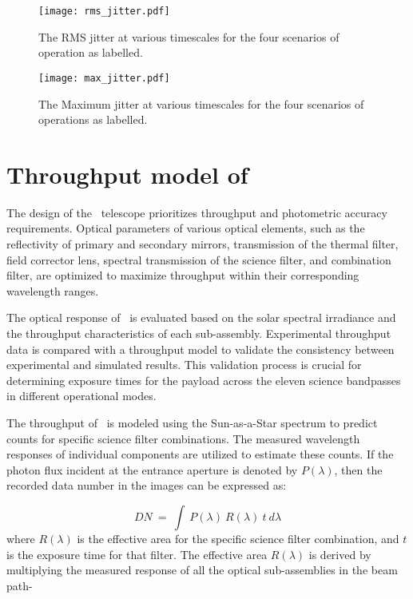 \begin{figure}[ht!]
    \centering
    \texttt{[image: rms\_jitter.pdf]}
    \caption{The RMS jitter at various timescales for the four scenarios of operation as labelled.}
    \label{fig:rms_jitter}
\end{figure}

\begin{figure}[ht!]
    \centering
    \texttt{[image: max\_jitter.pdf]}
    \caption{The Maximum jitter at various timescales for the four scenarios of operations as labelled.}
    \label{fig:max_jitter}
\end{figure}

\section{Throughput model of {\suit}}\label{sec:suit_throughput}

The design of the \suit~telescope prioritizes throughput and photometric accuracy requirements. Optical parameters of various optical elements, such as the reflectivity of primary and secondary mirrors, transmission of the thermal filter, field corrector lens, spectral transmission of the science filter, and combination filter, are optimized to maximize throughput within their corresponding wavelength ranges.

The optical response of \suit~is evaluated based on the solar spectral irradiance and the throughput characteristics of each sub-assembly. Experimental throughput data is compared with a throughput model to validate the consistency between experimental and simulated results. This validation process is crucial for determining exposure times for the payload across the eleven science bandpasses in different operational modes.

The throughput of \suit~is modeled using the Sun-as-a-Star spectrum to predict counts for specific science filter combinations. The measured wavelength responses of individual components are utilized to estimate these counts. If the photon flux incident at the entrance aperture is denoted by $P(\lambda)$, then the recorded data number in the images can be expressed as:

 \begin{equation}\label{eq1}
     DN~=~\int~P(\lambda)~R(\lambda)~t~d\lambda
 \end{equation}
where $R(\lambda)$ is the effective area for the specific science filter combination, and $t$ is the exposure time for that filter. The effective area $R(\lambda)$ is derived by multiplying the measured response of all the optical sub-assemblies in the beam path-

